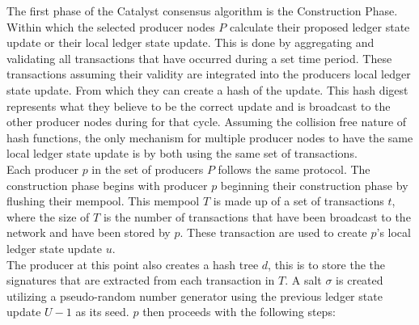 The first phase of the Catalyst consensus algorithm is the Construction Phase. Within which the selected producer nodes  $P$ calculate their proposed ledger state update or their local ledger state update. This is done by aggregating and validating all transactions that have occurred during a set time period. These transactions assuming their validity are integrated into the producers local ledger state update. From which they can create a hash of the update. This hash digest represents what they believe to be the correct update and is broadcast to the other producer nodes during for that cycle. Assuming the collision free nature of hash functions, the only mechanism for multiple producer nodes to have the same local ledger state update is by both using the same set of transactions. \\

Each producer $p$ in the set of producers $P$ follows the same protocol. The construction phase begins with producer $p$ beginning their construction phase by flushing their mempool. This mempool $T$ is made up of a set of transactions $t$, where the size of $T$ is the number of transactions that have been broadcast to the network and have been stored by $p$. These transaction are used to create $p$'s local ledger state update $u$. \\

The producer at this point also creates a hash tree $d$, this is to store the the signatures that are extracted from each transaction in $T$. A salt $\sigma$ is created utilizing a pseudo-random number generator using the previous ledger state update $U-1$ as its seed. $p$ then proceeds with the following steps:

